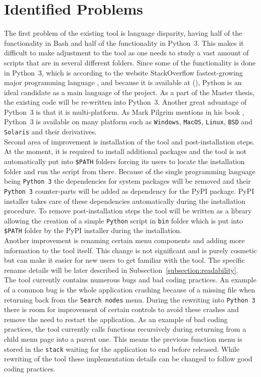 \section{Identified Problems}
\label{section:improvement}
The first problem of the existing tool is language disparity, having half of the functionality in Bash and half of the functionality in Python~3. This makes it difficult to make adjustment to the tool as one needs to study a vast amount of scripts that are in several different folders. Since some of the functionality is done in Python~3, which is according to the website StackOverflow fastest-growing major programming language \cite{pythonfastestgrowing}, and because it is available at  (), Python is an ideal candidate as a main language of the project. As a part of the Master thesis, the existing code will be re-written into Python~3. Another great advantage of Python~3 is that it is multi-platform. As Mark Pilgrim mentions in his book \cite{Pilgrimc2010}, Python~3 is available on many platform such as \texttt{Windows}, \texttt{MacOS}, \texttt{Linux}, \texttt{BSD} and \texttt{Solaris} and their derivatives.\\
Second area of improvement is installation of the tool and post-installation steps. At the moment, it is required to install additional packages and the tool is not automatically put into \texttt{\$PATH} folders forcing its users to locate the installation folder and run the script from there. Because of the single programming language being \texttt{Python~3} the dependencies for system packages will be removed and their \mbox{\texttt{Python~3}} counter-parts will be added as dependency for the PyPI package. PyPI installer takes care of these dependencies automatically during the installation procedure. To remove post-installation steps the tool will be written as a library allowing the creation of a simple \texttt{Python} script in \texttt{bin} folder which is put into \texttt{\$PATH} folder by the PyPI installer during the installation.\\
Another improvement is renaming certain menu components and adding more information to the tool itself. This change is not significant and is purely cosmetic but can make it easier for new users to get familiar with the tool. The specific rename details will be later described in Subsection~\ref{subsection:readability}.\\
The tool currently contains numerous bugs and bad coding practices. An example of a common bug is the whole application crashing because of a missing file when returning back from the \texttt{Search nodes} menu. During the rewriting into \texttt{Python~3} there is room for improvement of certain controls to avoid these crashes and remove the need to restart the application. As an example of bad coding practices, the tool currently calls functions recursively during returning from a child menu page into a parent one. This means the previous function menu is stored in the \texttt{stack} waiting for the application to end before released. While rewriting of the tool these implementation details can be changed to follow good coding practices.
